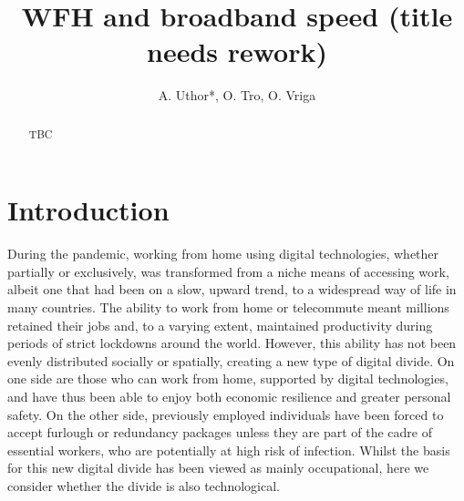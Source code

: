 \documentclass[Royal,times,sageh]{sagej}
\begin{document}
\title{WFH and broadband speed (title needs rework)}

\runninghead{}

\author{A. Uthor*, O. Tro, O. Vriga}




\begin{abstract}
TBC
\end{abstract}


\maketitle

\hypertarget{sec:1}{%
\section{Introduction}\label{sec:1}}

During the pandemic, working from home using digital technologies,
whether partially or exclusively, was transformed from a niche means of
accessing work, albeit one that had been on a slow, upward trend, to a
widespread way of life in many countries. The ability to work from home
or telecommute meant millions retained their jobs and, to a varying
extent, maintained productivity during periods of strict lockdowns
around the world. However, this ability has not been evenly distributed
socially or spatially, creating a new type of digital divide. On one
side are those who can work from home, supported by digital
technologies, and have thus been able to enjoy both economic resilience
and greater personal safety. On the other side, previously employed
individuals have been forced to accept furlough or redundancy packages
unless they are part of the cadre of essential workers, who are
potentially at high risk of infection. Whilst the basis for this new
digital divide has been viewed as mainly occupational, here we consider
whether the divide is also technological.
\end{document}
